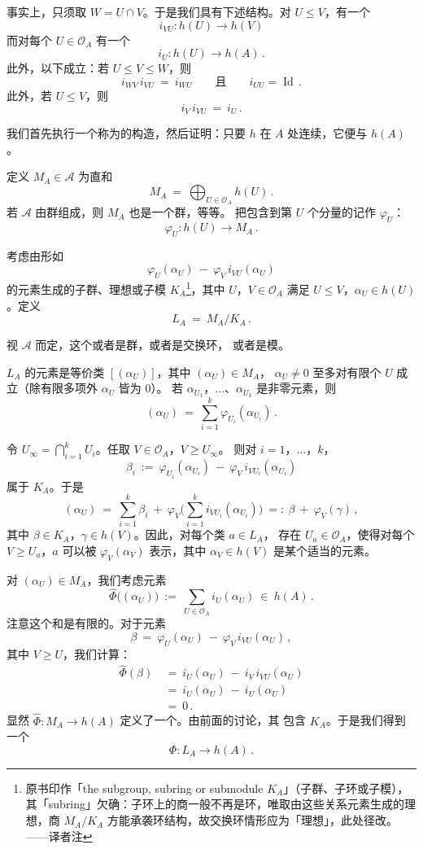 事实上，只须取 $W=U\cap V$。于是我们具有下述结构。对 $U\leq V$，有一个%
\trHomomorphism
\[i_{VU}\colon h(U)\longrightarrow h(V)
\]
而对每个 $U\in\mathcal{O}_{A}$ 有一个\trHomomorphism
\[i_{U}\colon h(U)\longrightarrow h(A)\,.
\]
此外，以下成立：若 $U\leq V\leq W$，则
\[i_{WV}\,i_{VU}\ =\ i_{WU}\qquad\text{且}\qquad i_{UU}=\operatorname{Id}\,.
\]
此外，若 $U\leq V$，则
\[i_{V}\,i_{VU}\ =\ i_{U}\,.
\]

我们首先执行一个称为\trDirectedLimit{}的构造，然后证明：只要 $h$ 在 $A$
处连续，它便与 $h(A)$\trIsomorphic。

定义 $M_{A}\in\mathcal{A}$ 为直和
\[M_{A}\ =\ \bigoplus_{U\in\mathcal{O}_{A}}h(U)\,.
\]
若 $\mathcal{A}$ 由\trAbelian{}群组成，则 $M_{A}$ 也是一个\trAbelian{}群，等等。
把包含到第 $U$ 个分量的\trHomomorphism{}记作 $\varphi_{U}$：
\[\varphi_{U}\colon h(U)\longrightarrow M_{A}\,.
\]

考虑由形如
\[\varphi_{U}(\alpha_{U})\ -\ \varphi_{V}\,i_{VU}(\alpha_{U})
\]
的元素生成的子群、理想或子模 $K_{A}$\footnote{原书印作「the subgroup, subring or submodule $K_{A}$」（子群、子环或子模），其「subring」欠确：子环上的商一般不再是环，唯取由这些关系元素生成的理想，商 $M_{A}/K_{A}$ 方能承袭环结构，故交换环情形应为「理想」，此处径改。——译者注}，其中 $U$，$V\in\mathcal{O}_{A}$ 满足
$U\leq V$，$\alpha_{U}\in h(U)$。定义
\[L_{A}\ =\ M_{A}/K_{A}\,.
\]

视 $\mathcal{A}$ 而定，这个\trQuotient{}或者是\trAbelian{}群，或者是交换环，
或者是模。

$L_{A}$ 的元素是等价类 $[(\alpha_{U})]$，其中 $(\alpha_{U})\in M_{A}$，%
$\alpha_{U}\neq0$ 至多对有限个 $U$ 成立（除有限多项外 $\alpha_{U}$ 皆为 $0$）。%
若 $\alpha_{U_{1}}$，$\ldots$、$\alpha_{U_{k}}$
是非零元素，则
\[(\alpha_{U})\ =\ \sum_{i=1}^{k}\varphi_{U_{i}}(\alpha_{U_{i}})\,.
\]

令 $U_{\infty}=\bigcap_{i=1}^{k}U_{i}$。任取 $V\in\mathcal{O}_{A}$，$V\geq U_{\infty}$。
则对 $i=1$，$\ldots$，$k$，
\[\beta_{i}\ :=\ \varphi_{U_{i}}(\alpha_{U_{i}})\ -\ \varphi_{V}\,i_{VU_{i}}(\alpha_{U_{i}})
\]
属于 $K_{A}$。于是
\[(\alpha_{U})\ =\ \sum_{i=1}^{k}\beta_{i}\ +\ \varphi_{V}\!\Big(\sum_{i=1}^{k}i_{VU_{i}}(\alpha_{U_{i}})\Big)
\ =:\ \beta\ +\ \varphi_{V}(\gamma)\,,
\]
其中 $\beta\in K_{A}$，$\gamma\in h(V)$。因此，对每个类 $a\in L_{A}$，
存在 $U_{a}\in\mathcal{O}_{A}$，使得对每个 $V\geq U_{a}$，$a$ 可以被
$\varphi_{V}(\alpha_{V})$ 表示，其中 $\alpha_{V}\in h(V)$ 是某个适当的元素。

对 $(\alpha_{U})\in M_{A}$，我们考虑元素
\[\hat{\Phi}\bigl((\alpha_{U})\bigr)\ :=\ \sum_{U\in\mathcal{O}_{A}}i_{U}(\alpha_{U})\ \in\ h(A)\,.
\]
注意这个和是有限的。对于元素
\[\beta\ =\ \varphi_{U}(\alpha_{U})\ -\ \varphi_{V}\,i_{VU}(\alpha_{U})\,,
\]
其中 $V\geq U$，我们计算：
\begin{align*}
\hat{\Phi}(\beta)\ &=\ i_{U}(\alpha_{U})\ -\ i_{V}\,i_{VU}(\alpha_{U})\\
&=\ i_{U}(\alpha_{U})\ -\ i_{U}(\alpha_{U})\\
&=\ 0\,.
\end{align*}
显然 $\hat{\Phi}\colon M_{A}\to h(A)$ 定义了一个\trHomomorphism。由前面的讨论，其%
\trKernel{}包含 $K_{A}$。于是我们得到一个\trHomomorphism
\[\Phi\colon L_{A}\longrightarrow h(A)\,.
\]

